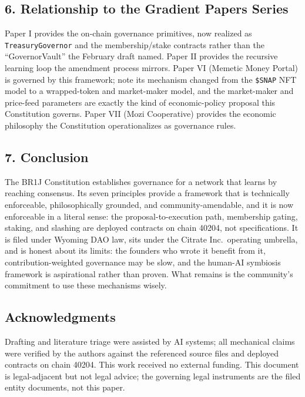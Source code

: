 \subsection{6. Relationship to the Gradient Papers
Series}\label{relationship-to-the-gradient-papers-series}

Paper I provides the on-chain governance primitives, now realized as
\texttt{TreasuryGovernor} and the membership/stake contracts rather than
the ``GovernorVault'' the February draft named. Paper II provides the
recursive learning loop the amendment process mirrors. Paper VI (Memetic
Money Portal) is governed by this framework; note its mechanism changed
from the \texttt{\$SNAP} NFT model to a wrapped-token and market-maker
model, and the market-maker and price-feed parameters are exactly the
kind of economic-policy proposal this Constitution governs. Paper VII
(Mozi Cooperative) provides the economic philosophy the Constitution
operationalizes as governance rules.

\subsection{7. Conclusion}\label{conclusion}

The BR1J Constitution establishes governance for a network that learns
by reaching consensus. Its seven principles provide a framework that is
technically enforceable, philosophically grounded, and
community-amendable, and it is now enforceable in a literal sense: the
proposal-to-execution path, membership gating, staking, and slashing are
deployed contracts on chain 40204, not specifications. It is filed under
Wyoming DAO law, sits under the Citrate Inc.~operating umbrella, and is
honest about its limits: the founders who wrote it benefit from it,
contribution-weighted governance may be slow, and the human-AI symbiosis
framework is aspirational rather than proven. What remains is the
community's commitment to use these mechanisms wisely.

\subsection{Acknowledgments}\label{acknowledgments}

Drafting and literature triage were assisted by AI systems; all
mechanical claims were verified by the authors against the referenced
source files and deployed contracts on chain 40204. This work received
no external funding. This document is legal-adjacent but not legal
advice; the governing legal instruments are the filed entity documents,
not this paper.

